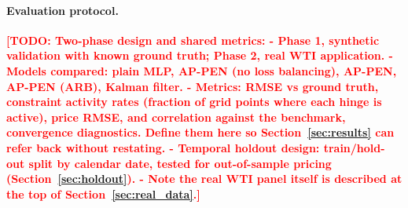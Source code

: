 \documentclass[11pt, a4paper]{article}
\newcommand{\todo}[1]{\textcolor{red}{\textbf{[TODO: #1]}}}
\begin{document}
%
%
%
%

\paragraph{Evaluation protocol.}
\todo{Two-phase design and shared metrics:
  - Phase 1, synthetic validation with known ground truth; Phase 2, real WTI
    application.
  - Models compared: plain MLP, AP-PEN (no loss balancing),
    AP-PEN, AP-PEN (ARB), Kalman filter.
  - Metrics: RMSE vs ground truth, constraint activity rates (fraction of
    grid points where each hinge is active), price RMSE, and correlation
    against the benchmark, convergence diagnostics. Define them here so
    Section~\ref{sec:results} can refer back without restating.
  - Temporal holdout design: train/hold-out split by calendar date, tested
    for out-of-sample pricing (Section~\ref{sec:holdout}).
  - Note the real WTI panel itself is described at the top of Section~\ref{sec:real_data}.}
\end{document}
